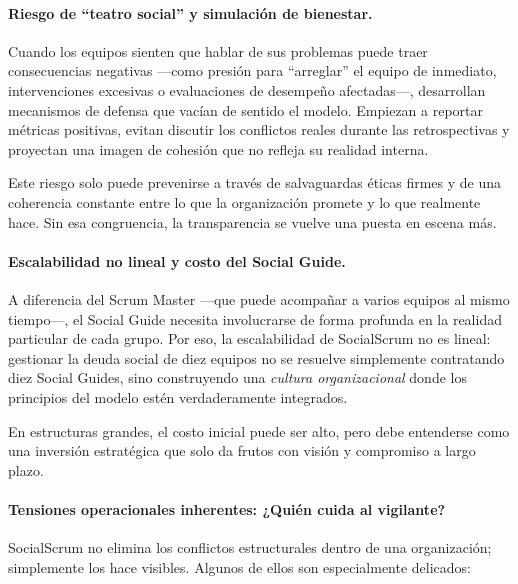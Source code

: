 \paragraph{Riesgo de ``teatro social'' y simulación de bienestar.}
Cuando los equipos sienten que hablar de sus problemas puede traer consecuencias negativas —como presión para ``arreglar'' el equipo de inmediato, intervenciones excesivas o evaluaciones de desempeño afectadas—, desarrollan mecanismos de defensa que vacían de sentido el modelo. Empiezan a reportar métricas positivas, evitan discutir los conflictos reales durante las retrospectivas y proyectan una imagen de cohesión que no refleja su realidad interna.

Este riesgo solo puede prevenirse a través de salvaguardas éticas firmes y de una coherencia constante entre lo que la organización promete y lo que realmente hace. Sin esa congruencia, la transparencia se vuelve una puesta en escena más.

\paragraph{Escalabilidad no lineal y costo del Social Guide.}
A diferencia del Scrum Master —que puede acompañar a varios equipos al mismo tiempo—, el Social Guide necesita involucrarse de forma profunda en la realidad particular de cada grupo. Por eso, la escalabilidad de SocialScrum no es lineal: gestionar la deuda social de diez equipos no se resuelve simplemente contratando diez Social Guides, sino construyendo una \emph{cultura organizacional} donde los principios del modelo estén verdaderamente integrados.

En estructuras grandes, el costo inicial puede ser alto, pero debe entenderse como una inversión estratégica que solo da frutos con visión y compromiso a largo plazo.

\paragraph{Tensiones operacionales inherentes: ¿Quién cuida al vigilante?}
SocialScrum no elimina los conflictos estructurales dentro de una organización; simplemente los hace visibles. Algunos de ellos son especialmente delicados:

